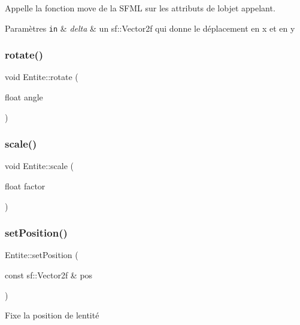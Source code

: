 Appelle la fonction move de la S\+F\+ML sur les attributs de l\textquotesingle{}objet appelant. 
\begin{DoxyParams}[1]{Paramètres}
\mbox{\tt in}  & {\em delta} & un {\ttfamily sf\+::\+Vector2f} qui donne le déplacement en x et en y \\
\hline
\end{DoxyParams}
\mbox{\label{class_entite_a620502288a6a0fc619eb4cab0fbe2289}} 
\subsubsection{\texorpdfstring{rotate()}{rotate()}}
{\footnotesize\ttfamily void Entite\+::rotate (\begin{DoxyParamCaption}\item[{float}]{angle }\end{DoxyParamCaption})}

\mbox{\label{class_entite_a08e80693f0b1293f5a0ab9d04a5aac0e}} 
\subsubsection{\texorpdfstring{scale()}{scale()}}
{\footnotesize\ttfamily void Entite\+::scale (\begin{DoxyParamCaption}\item[{float}]{factor }\end{DoxyParamCaption})}

\mbox{\label{class_entite_aa7fe4a7ebd8eb4c80ef9fdb7d97f2dad}} 
\subsubsection{\texorpdfstring{set\+Position()}{setPosition()}}
{\footnotesize\ttfamily Entite\+::set\+Position (\begin{DoxyParamCaption}\item[{const sf\+::\+Vector2f \&}]{pos }\end{DoxyParamCaption})}



Fixe la position de l\textquotesingle{}entité 

